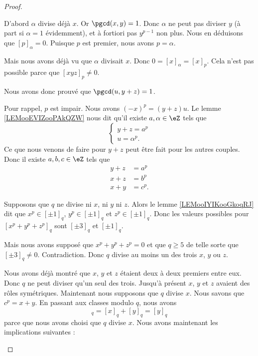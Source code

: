 \begin{proof}
\begin{subproof}
		D'abord \( \alpha\) divise déjà \( x\). Or \( \pgcd(x,y)=1\). Donc \( \alpha\) ne peut pas diviser \( y\) (à part si \( \alpha=1\) évidemment), et à fortiori pas \( y^{p-1}\) non plus. Nous en déduisons que \( [p]_{\alpha}=0\). Puisque \( p\) est premier, nous avons \( p=\alpha\).

		Mais nous avons déjà vu que \( \alpha\) divisait \( x\). Donc \( 0=[x]_{\alpha}=[x]_p\). Cela n'est pas possible parce que \( [xyz]_p\neq 0\).

		Nous avons donc prouvé que \( \pgcd(u,y+z)=1\).


		Pour rappel, \( p\) est impair.  Nous avons \( (-x)^p=(y+z)u\). Le lemme \ref{LEMooEVIZooPAkQZW} nous dit qu'il existe \( a,\alpha\in \eZ\) tels que
		\begin{equation}        \label{EQooKMPZooCShIIT}
			\begin{cases}
				y+z=a^p \\
				u=\alpha^p.
			\end{cases}
		\end{equation}
		Ce que nous venons de faire pour \(y+z\) peut être fait pour les autres couples. Donc il existe \( a,b,c\in \eZ\) tels que
		\begin{subequations}
			\begin{align}
				y+z & =a^p  \\
				x+z & =b^p  \\
				x+y & =c^p.
			\end{align}
		\end{subequations}

		Supposons que \( q\) ne divise ni \( x\), ni \( y\) ni \( z\). Alors le lemme \ref{LEMooIYIKooGkoqRJ} dit que \( x^p\in [\pm 1]_q\), \( y^p\in [\pm 1]_q\) et \( z^p\in[\pm 1]_q\). Donc les valeurs possibles pour \( [x^p+y^p+z^p]_q\) sont \( [\pm 3]_q\) et \( [\pm 1]_q\).

		Mais nous avons supposé que \( x^p+y^p+z^p=0\) et que \( q\ge 5\) de telle sorte que \( [\pm3]_q\neq 0\). Contradiction. Donc \( q\) divise au moins un des trois \( x\), \( y\) ou \( z\).

		Nous avons déjà montré que \( x\), \( y\) et \( z\) étaient deux à deux premiers entre eux. Donc \( q\) ne peut diviser qu'un seul des trois.
		\spitem[\( q\) divise \( x\)]
		Jusqu'à présent \( x\), \( y\) et \(z \) avaient des rôles symétriques. Maintenant nous supposons que \( q\) divise \( x\).
		\spitem[\( {[y^p]_q=[\pm 1]_q}\)]
		Nous savons que \( c^p=x+y\). En passant aux classes modulo \( q\), nous avons
		\begin{equation}
			[c^p]_q=[x]_q+[y]_q=[y]_q
		\end{equation}
		parce que nous avons choisi que \( q\) divise \( x\). Nous avons maintenant les implications suivantes :


\end{subproof}
\end{proof}
